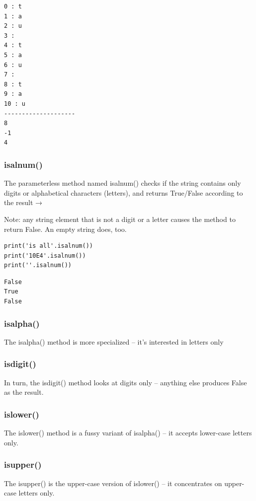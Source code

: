\documentclass[11pt]{article}
\begin{document}
\begin{verbatim}
0 : t
1 : a
2 : u
3 :  
4 : t
5 : a
6 : u
7 :  
8 : t
9 : a
10 : u
--------------------
8
-1
4
\end{verbatim}

\subsubsection{isalnum()}
\label{sec:orgd9971c1}
The parameterless method named isalnum() checks if the string contains
only digits or alphabetical characters (letters), and returns
True/False according to the result →

Note: any string element that is not a digit or a letter causes the
method to return False. An empty string does, too.

\begin{verbatim}
print('is all'.isalnum())
print('10E4'.isalnum())
print(''.isalnum())
\end{verbatim}

\begin{verbatim}
False
True
False
\end{verbatim}

\subsubsection{isalpha()}
\label{sec:org166bd66}
The isalpha() method is more specialized – it’s interested in letters
only

\subsubsection{isdigit()}
\label{sec:orgfc931eb}
In turn, the isdigit() method looks at digits only – anything else
produces False as the result.

\subsubsection{islower()}
\label{sec:orgfbade9a}
The islower() method is a fussy variant of isalpha() – it accepts
lower-case letters only.

\subsubsection{isupper()}
\label{sec:org5860db8}
The isupper() is the upper-case version of islower() – it concentrates
on upper-case letters only.
\end{document}
